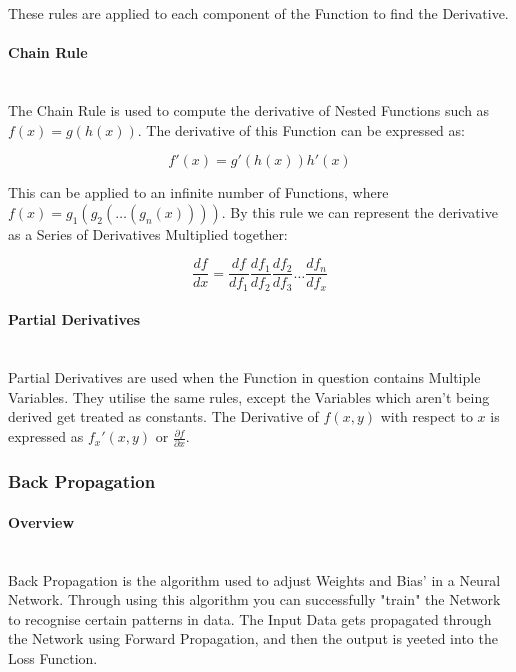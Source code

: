 \begin{flushleft}
                    These rules are applied to each component of the Function to find the Derivative. 

                \paragraph{Chain Rule}  \mbox{} \\
                    \vspace{0.2cm}
                    The Chain Rule is used to compute the derivative of Nested Functions such as $f(x) = g(h(x))$. The derivative of this Function can be expressed as: \\
                    \vspace{0.4cm}

                    \[f'(x) =  g'(h(x))h'(x)\]

                    \vspace{0.4cm}

                    This can be applied to an infinite number of Functions, where $f(x) = g_{1}(g_{2}(\hdots(g_{n}(x))))$. By this rule we can represent the derivative as
                    a Series of Derivatives Multiplied together:

                    \[
                        \frac{df}{dx} = \frac{df}{df_{1}} \frac{df_{1}}{df_{2}} \frac{df_{2}}{df_{3}} \hdots \frac{df_{n}}{df_{x}}
                    \]

                \paragraph{Partial Derivatives}  \mbox{} \\
                    \vspace{0.2cm}
                    Partial Derivatives are used when the Function in question contains Multiple Variables. They utilise the same rules, except the Variables
                    which aren't being derived get treated as constants. The Derivative of $f(x, y)$ with respect to $x$ is expressed as $f_{x}'(x,y)$ or 
                    {\Large $\frac{\partial f}{\partial x}$}. 

            \subsubsection{Back Propagation}
                \paragraph{Overview} \mbox{} \\
                    \vspace{0.2cm}
                    Back Propagation is the algorithm used to adjust Weights and Bias' in a Neural Network. Through using this algorithm you can successfully "train"
                    the Network to recognise certain patterns in data. The Input Data gets propagated through the Network using Forward Propagation, and then the output
                    is yeeted into the Loss Function.


\end{flushleft}
